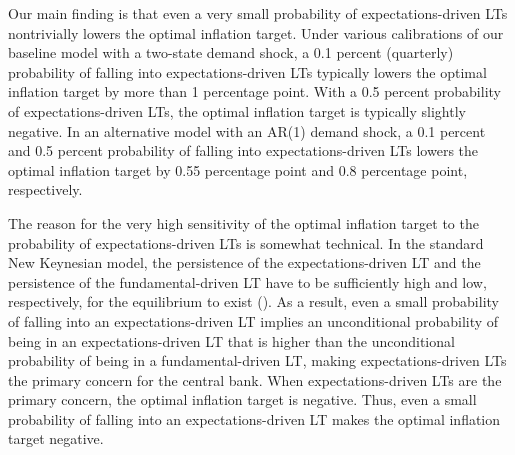 \documentclass[11pt]{article}
\begin{document}
	Our main finding is that even a very small probability of expectations-driven LTs nontrivially lowers the optimal inflation target. Under various calibrations of our baseline model with a two-state demand shock, a 0.1 percent (quarterly) probability of falling into expectations-driven LTs typically lowers the optimal inflation target by more than 1 percentage point. With a 0.5 percent probability of expectations-driven LTs, the optimal inflation target is typically slightly negative. In an alternative model with an AR(1) demand shock, a 0.1 percent and 0.5 percent probability of falling into expectations-driven LTs lowers the optimal inflation target by 0.55 percentage point and 0.8 percentage point, respectively.
	
	
	The reason for the very high sensitivity of the optimal inflation target to the probability of expectations-driven LTs is somewhat technical. In the standard New Keynesian model, the persistence of the expectations-driven LT and the persistence of the fundamental-driven LT have to be sufficiently high and low, respectively, for the equilibrium to exist (\citet{NakataSchmidt2019}). As a result, even a small probability of falling into an expectations-driven LT implies an unconditional probability of being in an expectations-driven LT that is higher than the unconditional probability of being in a fundamental-driven LT, making expectations-driven LTs the primary concern for the central bank. When expectations-driven LTs are the primary concern, the optimal inflation target is negative. Thus, even a small probability of falling into an expectations-driven LT makes the optimal inflation target negative.
	
	
\end{document}
